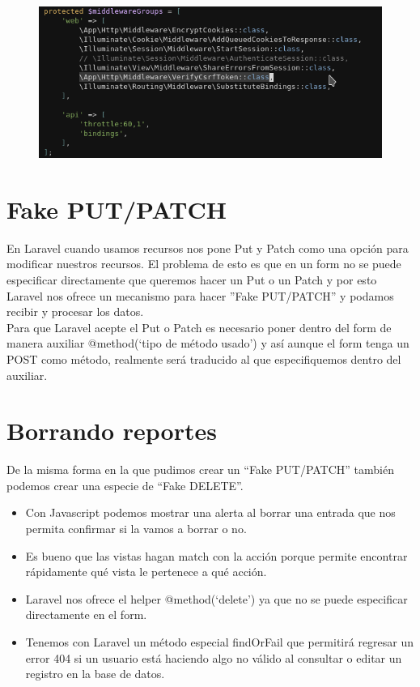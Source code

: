 \documentclass{article}
\begin{document}
\begin{figure}[h!]
  \centering
  \includegraphics[scale=0.5]{./Pictures/068_middlewareGroups.png}
\end{figure}


\section{Fake PUT/PATCH}%
En Laravel cuando usamos recursos nos pone Put y Patch como una opción para
modificar nuestros recursos. El problema de esto es que en un form no se puede
especificar directamente que queremos hacer un Put o un Patch y por esto
Laravel nos ofrece un mecanismo para hacer ”Fake PUT/PATCH” y podamos recibir y
procesar los datos.\\

Para que Laravel acepte el Put o Patch es necesario poner dentro del form de
manera auxiliar @method(‘tipo de método usado’) y así aunque el form tenga un
POST como método, realmente será traducido al que especifiquemos dentro del
auxiliar.\\


\section{Borrando reportes}%
De la misma forma en la que pudimos crear un “Fake PUT/PATCH” también podemos
crear una especie de “Fake DELETE”.\\

\begin{itemize}
  \item Con Javascript podemos mostrar una alerta al borrar una entrada que nos
    permita confirmar si la vamos a borrar o no.
  \item Es bueno que las vistas hagan match con la acción porque permite
    encontrar rápidamente qué vista le pertenece a qué acción.
  \item Laravel nos ofrece el helper @method(‘delete’) ya que no se puede
    especificar directamente en el form.
  \item Tenemos con Laravel un método especial findOrFail que permitirá
    regresar un error 404 si un usuario está haciendo algo no válido al
    consultar o editar un registro en la base de datos.
\end{itemize}
\end{document}
